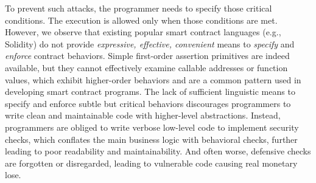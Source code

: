 

To prevent such attacks, the programmer needs to specify those critical
conditions. The execution is allowed only when those conditions are met.
However, we observe that existing popular smart contract languages (e.g.,
Solidity) do not provide \emph{expressive, effective, convenient} means to
\emph{specify} and \emph{enforce} contract behaviors.
Simple first-order assertion primitives are indeed available, but they cannot
effectively examine callable addresses or function values, which exhibit
higher-order behaviors and are a common pattern used in developing smart contract
programs.
The lack of sufficient linguistic means to specify and enforce subtle but
critical behaviors discourages programmers to write clean and maintainable
code with higher-level abstractions.
Instead, programmers are obliged to write verbose low-level code
to implement security checks, which conflates the main business logic with
behavioral checks, further leading to poor readability and maintainability.
And often worse, defensive checks are forgotten or disregarded, leading to
vulnerable code causing real monetary lose.

